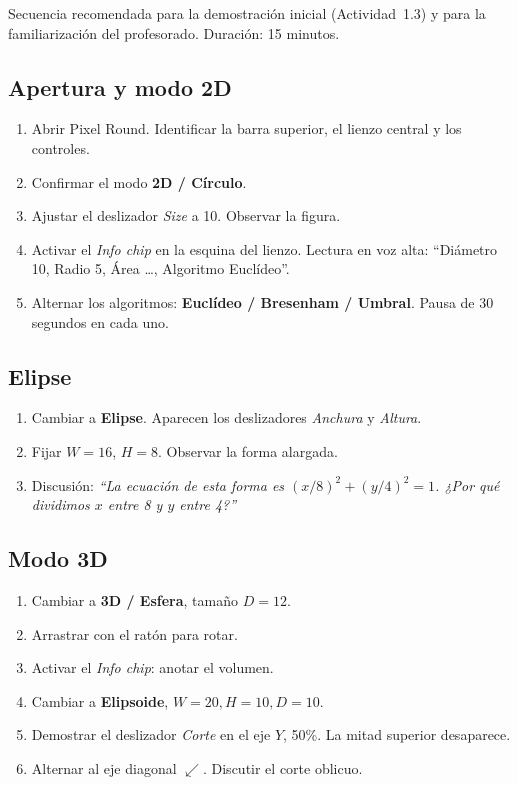 \documentclass[12pt,a4paper]{scrartcl}
\newcommand{\acc}[1]{\textcolor{accent}{\textbf{#1}}}
\begin{document}
Secuencia recomendada para la demostración inicial (Actividad~1.3) y para la familiarización del profesorado. Duración: 15 minutos.

\subsection{Apertura y modo 2D}
\begin{enumerate}[leftmargin=1.5em,itemsep=0.15em,topsep=0.3em]
  \item Abrir Pixel Round. Identificar la barra superior, el lienzo central y los controles.
  \item Confirmar el modo \acc{2D / Círculo}.
  \item Ajustar el deslizador \emph{Size} a 10. Observar la figura.
  \item Activar el \emph{Info chip} en la esquina del lienzo. Lectura en voz alta: ``Diámetro 10, Radio 5, Área \dots, Algoritmo Euclídeo''.
  \item Alternar los algoritmos: \acc{Euclídeo / Bresenham / Umbral}. Pausa de 30 segundos en cada uno.
\end{enumerate}

\subsection{Elipse}
\begin{enumerate}[leftmargin=1.5em,itemsep=0.15em,topsep=0.3em]
  \item Cambiar a \acc{Elipse}. Aparecen los deslizadores \emph{Anchura} y \emph{Altura}.
  \item Fijar $W = 16$, $H = 8$. Observar la forma alargada.
  \item Discusión: \emph{``La ecuación de esta forma es $(x/8)^2 + (y/4)^2 = 1$. ¿Por qué dividimos $x$ entre 8 y $y$ entre 4?''}
\end{enumerate}

\subsection{Modo 3D}
\begin{enumerate}[leftmargin=1.5em,itemsep=0.15em,topsep=0.3em]
  \item Cambiar a \acc{3D / Esfera}, tamaño $D = 12$.
  \item Arrastrar con el ratón para rotar.
  \item Activar el \emph{Info chip}: anotar el volumen.
  \item Cambiar a \acc{Elipsoide}, $W = 20, H = 10, D = 10$.
  \item Demostrar el deslizador \emph{Corte} en el eje $Y$, 50\%. La mitad superior desaparece.
  \item Alternar al eje diagonal $\swarrow$. Discutir el corte oblicuo.
\end{enumerate}
\end{document}
